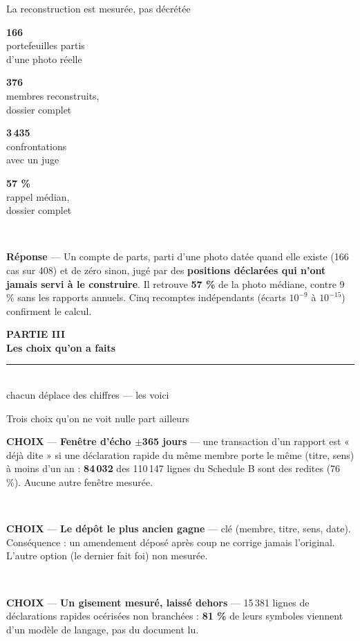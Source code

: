 \documentclass[11pt,aspectratio=169]{beamer}
\newcommand{\tuile}[3]{%
  \begin{minipage}[t]{0.23\textwidth}\centering
    \colorbox{#1}{\parbox[c][20mm][c]{\dimexpr\linewidth-8pt}{\centering
      {\color{white}\Large\textbf{#2}}\\[0.5mm]{\color{white}\footnotesize #3}}}
  \end{minipage}}
\newcommand{\choixbox}[1]{%
  \colorbox{alertred!8}{\parbox{\dimexpr\linewidth-8pt}{\scriptsize
    \textbf{\textcolor{alertred}{CHOIX}}\; --- #1}}}
\newcommand{\repband}[1]{%
  \colorbox{okgreen!12}{\parbox{\dimexpr\textwidth-10pt}{\scriptsize
    \textbf{\textcolor{okgreen}{Réponse}}\; --- #1}}}
\newcommand{\chapdivider}[3]{%
  \begin{frame}[plain]
    \centering\vfill
    {\color{helec!85}\large\textbf{#1}}\\[3.5mm]
    {\color{black!88}\fontsize{29}{33}\selectfont\textbf{#2}}\\[4mm]
    {\color{helec!45}\rule{0.30\textwidth}{1.2pt}}\\[4mm]
    {\color{black!55}\large #3}
    \vfill
  \end{frame}}
\begin{document}
\begin{frame}{La reconstruction est mesurée, pas décrétée}
  \centering\vspace{2mm}
  \tuile{okgreen}{166}{portefeuilles partis\\ d'une photo réelle}
  \tuile{okgreen}{376}{membres reconstruits,\\ dossier complet}
  \tuile{helec}{3\,435}{confrontations\\ avec un juge}
  \tuile{helec}{57 \%}{rappel médian,\\ dossier complet}\\[6mm]
  \repband{Un compte de parts, parti d'une photo datée quand elle existe (166 cas sur 408) et de
  zéro sinon, jugé par des \textbf{positions déclarées qui n'ont jamais servi à le construire}. Il
  retrouve \textbf{57 \%} de la photo médiane, contre 9 \% sans les rapports annuels. Cinq recomptes
  indépendants (écarts $10^{-9}$ à $10^{-15}$) confirment le calcul.}
\end{frame}

\chapdivider{PARTIE III}{Les choix qu'on a faits}{chacun déplace des chiffres --- les voici}


\begin{frame}{Trois choix qu'on ne voit nulle part ailleurs}
  \vspace{2mm}
  \choixbox{\textbf{Fenêtre d'écho $\pm$365 jours} --- une transaction d'un rapport est « déjà dite »
  si une déclaration rapide du même membre porte le même (titre, sens) à moins d'un an :
  \textbf{84\,032} des 110\,147 lignes du Schedule B sont des redites (76 \%). Aucune autre fenêtre mesurée.}\\[3mm]
  \choixbox{\textbf{Le dépôt le plus ancien gagne} --- clé (membre, titre, sens, date). Conséquence :
  un amendement déposé après coup ne corrige jamais l'original. L'autre option (le dernier fait foi) non mesurée.}\\[3mm]
  \choixbox{\textbf{Un gisement mesuré, laissé dehors} --- 15\,381 lignes de déclarations rapides
  océrisées non branchées : \textbf{81 \%} de leurs symboles viennent d'un modèle de langage, pas du document lu.}
\end{frame}
\end{document}
